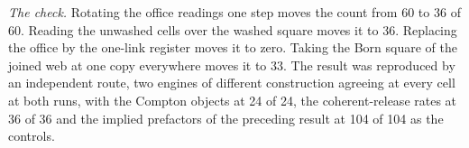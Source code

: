\begin{chproof}
\textit{The check.} Rotating the office readings one step moves the count from 60 to 36 of 60. Reading the unwashed cells over the washed square moves it to 36. Replacing the office by the one-link register moves it to zero. Taking the Born square of the joined web at one copy everywhere moves it to 33. The result was reproduced by an independent route, two engines of different construction agreeing at every cell at both runs, with the Compton objects at 24 of 24, the coherent-release rates at 36 of 36 and the implied prefactors of the preceding result at 104 of 104 as the controls.
\end{chproof}
\par\medskip{}\label{narr:close:9-3}\par
